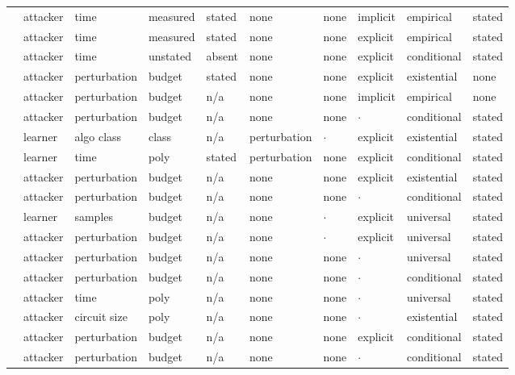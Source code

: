 \begin{landscape}
\begin{longtable}{rlllllllll}
\cite{FJTYCDCP23} & attacker & time & measured & stated & none & none & implicit & empirical & stated \\
\cite{DJYWWMNL26} & attacker & time & measured & stated & none & none & explicit & empirical & stated \\
\cite{JYCDTCP21} & attacker & time & unstated & absent & none & none & explicit & conditional & stated \\
\cite{TCBM20} & attacker & perturbation & budget & stated & none & none & explicit & existential & none \\
\cite{CGBSHC22} & attacker & perturbation & budget & n/a & none & none & implicit & empirical & none \\
\cite{SLDLN25} & attacker & perturbation & budget & n/a & none & none & $\cdot$ & conditional & stated \\
\cite{BPR19} & learner & algo class & class & n/a & perturbation & $\cdot$ & explicit & existential & stated \\
\cite{BLPR18} & learner & time & poly & stated & perturbation & none & explicit & conditional & stated \\
\cite{GMFSRWG18} & attacker & perturbation & budget & n/a & none & none & explicit & existential & stated \\
\cite{FFF18} & attacker & perturbation & budget & n/a & none & none & $\cdot$ & conditional & stated \\
\cite{AH23} & learner & samples & budget & n/a & none & $\cdot$ & explicit & universal & stated \\
\cite{LAGHJ19} & attacker & perturbation & budget & n/a & none & $\cdot$ & explicit & universal & stated \\
\cite{CRK19} & attacker & perturbation & budget & n/a & none & none & $\cdot$ & universal & stated \\
\cite{Mah19} & attacker & perturbation & budget & n/a & none & none & $\cdot$ & conditional & stated \\
\cite{EMM20} & attacker & time & poly & n/a & none & none & $\cdot$ & universal & stated \\
\cite{GJMM20} & attacker & circuit size & poly & n/a & none & none & $\cdot$ & existential & stated \\
\cite{MDM19} & attacker & perturbation & budget & n/a & none & none & explicit & conditional & stated \\
\cite{PSV23} & attacker & perturbation & budget & n/a & none & none & $\cdot$ & conditional & stated \\

\end{longtable}
\end{landscape}
